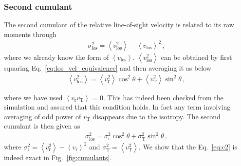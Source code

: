 \documentclass[a4paper,fleqn,usenatbib]{mnras}
\begin{document}
	\subsubsection{Second cumulant}
	The second cumulant of the relative line-of-sight velocity is related to its raw moments through
	\begin{eqnarray}
		\sigma^2_{\mathrm{los}} =  \left\langle v^2_{\mathrm{los}} \right\rangle - \left\langle v_{\mathrm{los}} \right\rangle^2  \, ,
	\end{eqnarray}
	\noindent where we already know the form of $\left\langle v_{\mathrm{los}} \right\rangle$. $\left\langle v^2_{\mathrm{los}} \right\rangle$ can be obtained by first squaring Eq.~\ref{eq:los_vel_equivalence} and then averaging it as below
	\begin{eqnarray}\label{eq:v2}
		\left\langle v^2_{\mathrm{los}} \right\rangle = \left\langle v^2_{\mathrm{r}}\right\rangle \cos^2\theta + \left\langle v^2_{\mathrm{T}}\right\rangle\sin^2\theta \, ,
	\end{eqnarray}
	
	\noindent where we have used $\left\langle v_{\mathrm{r}} v_{\mathrm{T}}\right\rangle$ = 0. This has indeed been checked from the simulation and assured that this condition holds. In fact any term involving averaging of odd power of $v_{\mathrm{T}}$ disappears due to the isotropy.  The second cumulant is then given as 
	\begin{eqnarray}\label{eq:c2}
		\sigma^2_{\mathrm{los}} =  \sigma^2_{\mathrm{r}} \cos^2\theta + \sigma^2_{\mathrm{T}} \sin^2\theta \, ,
	\end{eqnarray}
	\noindent where $\sigma^2_{\mathrm{r}} = \left\langle v^2_{\mathrm{r}} \right\rangle - \left\langle v_{\mathrm{r}}\right\rangle^2$ and $\sigma^2_{\mathrm{T}} = \left\langle v^2_{\mathrm{T}} \right\rangle$. We show that the Eq.~\ref{eq:c2} is indeed exact in Fig.~\ref{fig:cumulants}.
\end{document}
